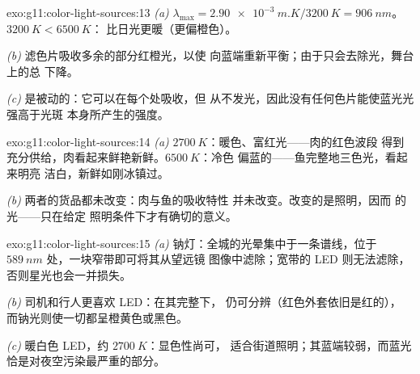 \begin{solution}{exo:g11:color-light-sources:13}
\emph{(a)} $\lambda_{\max} = \qty{2.90e-3}{m.K}/\qty{3200}{K} =
\qty{906}{nm}$。 $\qty{3200}{K} < \qty{6500}{K}$：
比日光更暖（更偏橙色）。

\emph{(b)} 滤色片吸收多余的部分红橙光，以使
向蓝端重新平衡；由于只会去除光，舞台上的总
下降。

\emph{(c)} 是被动的：它可以在每个处吸收，但
从不发光，因此没有任何色片能使蓝光光强高于光斑
本身所产生的强度。
\end{solution}

\begin{solution}{exo:g11:color-light-sources:14}
\emph{(a)} $\qty{2700}{K}$：暖色、富红光——肉的红色波段
得到充分供给，肉看起来鲜艳新鲜。$\qty{6500}{K}$：冷色
偏蓝的——鱼完整地三色光，看起来明亮
洁白，新鲜如刚冰镇过。

\emph{(b)} 两者的货品都未改变：肉与鱼的吸收特性
并未改变。改变的是照明，因而
的光——只在给定
照明条件下才有确切的意义。
\end{solution}

\begin{solution}{exo:g11:color-light-sources:15}
\emph{(a)} 钠灯：全城的光晕集中于一条谱线，位于
$\qty{589}{nm}$ 处，一块窄带即可将其从望远镜
图像中滤除；宽带的 LED 则无法滤除，
否则星光也会一并损失。

\emph{(b)} 司机和行人更喜欢 LED：在其完整下，
仍可分辨（红色外套依旧是红的），
而钠光则使一切都呈橙黄色或黑色。

\emph{(c)} 暖白色 LED，约 $\qty{2700}{K}$：显色性尚可，
适合街道照明；其蓝端较弱，而蓝光
恰是对夜空污染最严重的部分。
\end{solution}

